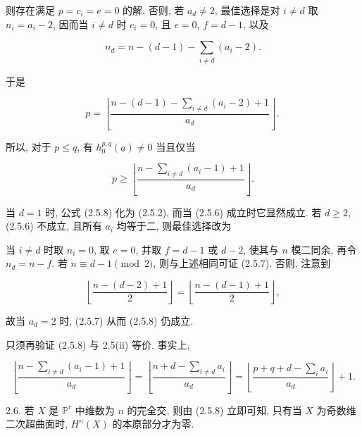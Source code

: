 则存在满足 $p=c_i=e=0$ 的解. 否则, 若 $a_d\ne2$, 最佳选择是对 $i\ne d$ 取 $n_i=a_i-2$, 因而当 $i\ne d$ 时 $c_i=0$, 且 $e=0$, $f=d-1$, 以及

\begin{equation*}
n_d=n-(d-1)-\sum_{i\ne d}(a_i-2).
\end{equation*}

于是

\begin{equation}\tag{2.5.7}
p=\left\lfloor
\frac{n-(d-1)-\sum_{i\ne d}(a_i-2)+1}{a_d}
\right\rfloor,
\end{equation}

所以, 对于 $p\leq q$, 有 $h_0^{p,q}(\underline a)\ne0$ 当且仅当

\begin{equation}\tag{2.5.8}
p\geq\left\lfloor
\frac{n-\sum_{i\ne d}(a_i-1)+1}{a_d}
\right\rfloor.
\end{equation}

当 $d=1$ 时, 公式 (2.5.8) 化为 (2.5.2), 而当 (2.5.6) 成立时它显然成立. 若 $d\geq2$, (2.5.6) 不成立, 且所有 $a_i$ 均等于二, 则最佳选择改为


当 $i\ne d$ 时取 $n_i=0$, 取 $e=0$, 并取 $f=d-1$ 或 $d-2$, 使其与 $n$ 模二同余, 再令 $n_d=n-f$. 若 $n\equiv d-1\pmod2$, 则与上述相同可证 (2.5.7). 否则, 注意到

\begin{equation*}
\left\lfloor\frac{n-(d-2)+1}{2}\right\rfloor
=\left\lfloor\frac{n-(d-1)+1}{2}\right\rfloor,
\end{equation*}

故当 $a_d=2$ 时, (2.5.7) 从而 (2.5.8) 仍成立.

只须再验证 (2.5.8) 与 2.5(ii) 等价. 事实上,

\begin{equation*}
\left\lfloor\frac{n-\sum_{i\ne d}(a_i-1)+1}{a_d}\right\rfloor
=\left\lfloor\frac{n+d-\sum_{i\ne d}a_i}{a_d}\right\rfloor
=\left\lfloor\frac{p+q+d-\sum_i a_i}{a_d}\right\rfloor+1.
\end{equation*}

2.6. 若 $X$ 是 $\mathbb P^r$ 中维数为 $n$ 的完全交, 则由 (2.5.8) 立即可知, 只有当 $X$ 为奇数维二次超曲面时, $H^n(X)$ 的本原部分才为零.
